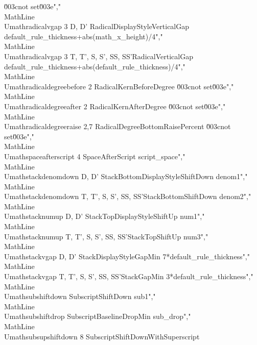                 {\u003cnot set\u003e}","\\MathLine{\\Umathradicalvgap}              {3}  {D, D'}                {RadicalDisplayStyleVerticalGap}          {default_rule_thickness+abs(math_x_height)/4}","\\MathLine{\\Umathradicalvgap}              {3}  {T, T', S, S', SS, SS'}{RadicalVerticalGap}                      {default_rule_thickness+abs(default_rule_thickness)/4}","\\MathLine{\\Umathradicaldegreebefore}      {2}  {}                     {RadicalKernBeforeDegree}                 {\u003cnot set\u003e}","\\MathLine{\\Umathradicaldegreeafter}       {2}  {}                     {RadicalKernAfterDegree}                  {\u003cnot set\u003e}","\\MathLine{\\Umathradicaldegreeraise}       {2,7}{}                     {RadicalDegreeBottomRaisePercent}         {\u003cnot set\u003e}","\\MathLine{\\Umathspaceafterscript}         {4}  {}                     {SpaceAfterScript}                        {script_space}","\\MathLine{\\Umathstackdenomdown}           {}   {D, D'}                {StackBottomDisplayStyleShiftDown}        {denom1}","\\MathLine{\\Umathstackdenomdown}           {}   {T, T', S, S', SS, SS'}{StackBottomShiftDown}                    {denom2}","\\MathLine{\\Umathstacknumup}               {}   {D, D'}                {StackTopDisplayStyleShiftUp}             {num1}","\\MathLine{\\Umathstacknumup}               {}   {T, T', S, S', SS, SS'}{StackTopShiftUp}                         {num3}","\\MathLine{\\Umathstackvgap}                {}   {D, D'}                {StackDisplayStyleGapMin}                 {7*default_rule_thickness}","\\MathLine{\\Umathstackvgap}                {}   {T, T', S, S', SS, SS'}{StackGapMin}                             {3*default_rule_thickness}","\\MathLine{\\Umathsubshiftdown}             {}   {}                     {SubscriptShiftDown}                      {sub1}","\\MathLine{\\Umathsubshiftdrop}             {}   {}                     {SubscriptBaselineDropMin}                {sub_drop}","\\MathLine{\\Umathsubsupshiftdown}          {8}  {}                     {SubscriptShiftDownWithSuperscript}     